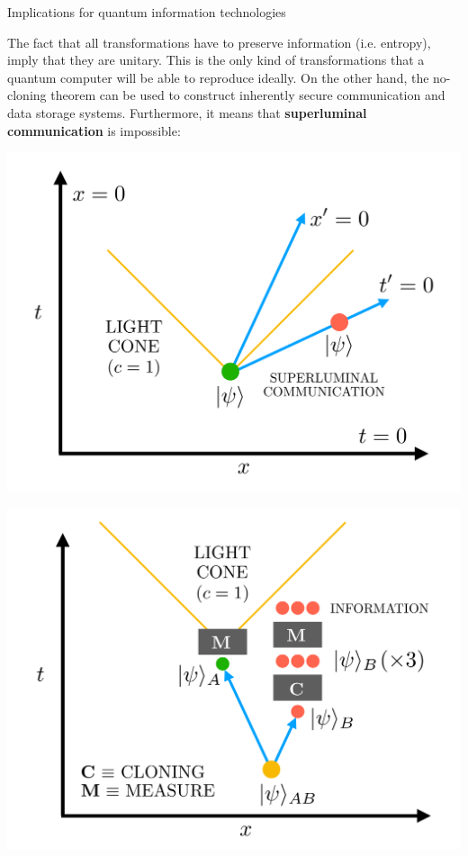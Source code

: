 \documentclass[9pt, handout, aspectratio=169]{beamer}	%
\begin{document}

\begin{frame}{Implications for quantum information technologies}

	The fact that all transformations have to preserve information (i.e. entropy), imply that they are unitary. This is the only kind of transformations that a quantum computer will be able to reproduce ideally. On the other hand, the no-cloning theorem can be used to construct inherently secure communication and data storage systems. Furthermore, it means that \textbf{superluminal communication} is impossible:

	\vspace{-2em}

	\begin{multicols}{2}

		\pause
		\begin{center}
			\includegraphics[width=.40\paperwidth]{Figures/quantum-background/superluminal-cloning-boost}
		\end{center}

		\columnbreak

		\pause
		\begin{center}
			\includegraphics[width=.40\paperwidth]{Figures/quantum-background/superluminal-cloning-communication}
		\end{center}


\end{multicols}
\end{frame}
\end{document}
